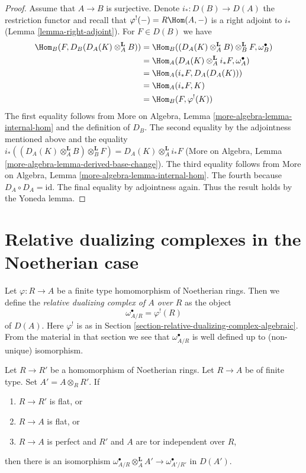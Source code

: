 \begin{proof}
\medskip\noindent
Assume that $A \to B$ is surjective. Denote $i_* : D(B) \to D(A)$
the restriction functor and recall that $\varphi^!(-) = R\Hom(A, -)$
is a right adjoint to $i_*$ (Lemma \ref{lemma-right-adjoint}).
For $F \in D(B)$ we have
\begin{align*}
\Hom_B(F, D_B(D_A(K) \otimes_A^\mathbf{L} B))
& =
\Hom_B((D_A(K) \otimes_A^\mathbf{L} B) \otimes_B^\mathbf{L} F,
\omega_B^\bullet) \\
& =
\Hom_A(D_A(K) \otimes_A^\mathbf{L} i_*F, \omega_A^\bullet) \\
& =
\Hom_A(i_*F, D_A(D_A(K))) \\
& =
\Hom_A(i_*F, K) \\
& =
\Hom_B(F, \varphi^!(K))
\end{align*}
The first equality follows from More on Algebra, Lemma
\ref{more-algebra-lemma-internal-hom} and the definition
of $D_B$. The second equality by the adjointness mentioned
above and the equality
$i_*((D_A(K) \otimes_A^\mathbf{L} B) \otimes_B^\mathbf{L} F) =
D_A(K) \otimes_A^\mathbf{L} i_*F$
(More on Algebra, Lemma \ref{more-algebra-lemma-derived-base-change}).
The third equality follows from More on Algebra, Lemma
\ref{more-algebra-lemma-internal-hom}. The fourth because
$D_A \circ D_A = \text{id}$. The final equality by adjointness again.
Thus the result holds by the Yoneda lemma.
\end{proof}






\section{Relative dualizing complexes in the Noetherian case}
\label{section-relative-dualizing-complexes-Noetherian}

\noindent
Let $\varphi : R \to A$ be a finite type homomorphism of
Noetherian rings. Then we define the {\it relative dualizing
complex of $A$ over $R$} as the object
$$
\omega_{A/R}^\bullet = \varphi^!(R)
$$
of $D(A)$. Here $\varphi^!$ is as in
Section \ref{section-relative-dualizing-complex-algebraic}.
From the material in that section we see that
$\omega_{A/R}^\bullet$ is well defined up to (non-unique) isomorphism.

\begin{lemma}
\label{lemma-base-change-relative-algebraic}
Let $R \to R'$ be a homomorphism of Noetherian rings.
Let $R \to A$ be of finite type. Set $A' = A \otimes_R R'$. If
\begin{enumerate}
\item $R \to R'$ is flat, or
\item $R \to A$ is flat, or
\item $R \to A$ is perfect
and $R'$ and $A$ are tor independent over $R$,
\end{enumerate}
then there is an isomorphism
$\omega_{A/R}^\bullet \otimes_A^\mathbf{L} A' \to \omega^\bullet_{A'/R'}$
in $D(A')$.
\end{lemma}

